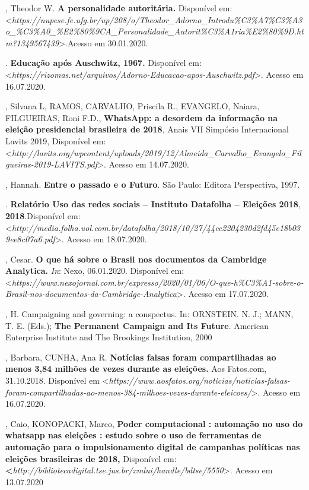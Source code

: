 \begin{bibliohedra}
, Theodor W. \textbf{A personalidade autoritária.} Disponível em:
\textless{}\emph{https://nupese.fe.ufg.br/up/208/o/Theodor\_Adorno\_Introdu\%C3\%A7\%C3\%A3o\_\%C3\%A0\_\%E2\%80\%9CA\_Personalidade\_Autorit\%C3\%A1ria\%E2\%80\%9D.htm?1349567439}\textgreater{}.Acesso
em 30.01.2020.

\titidem. \textbf{Educação após Auschwitz,
1967.} Disponível em:
\textless{}\emph{https://rizomas.net/arquivos/Adorno-Educacao-apos-Auschwitz.pdf}\textgreater{}.
Acesso em 16.07.2020.

, Silvana L, RAMOS, CARVALHO, Priscila R., EVANGELO, Naiara,
FILGUEIRAS, Roni F.D., \textbf{WhatsApp: a desordem da informação na
eleição presidencial brasileira de 2018}, Anais VII Simpósio
Internacional Lavits 2019, Disponível em:
\textless{}\emph{http://lavits.org/wpcontent/uploads/2019/12/Almeida\_Carvalho\_Evangelo\_Filgueiras-2019-LAVITS.pdf}\textgreater{}.
Acesso em 14.07.2020.

, Hannah. \textbf{Entre o passado e o Futuro}. São Paulo: Editora
Perspectiva, 1997.

. \textbf{Relatório Uso das redes sociais -- Instituto
Datafolha -- Eleições 2018}, \textbf{2018}.Disponível em:
\textless{}\emph{http://media.folha.uol.com.br/datafolha/2018/10/27/44cc2204230d2fd45e18b039ee8c07a6.pdf}\textgreater{}.
Acesso em 18.07.2020.

, Cesar. \textbf{O que há sobre o Brasil nos documentos da
Cambridge Analytica.} \emph{In}: Nexo, 06.01.2020. Disponível em:
\textless{}\emph{https://www.nexojornal.com.br/expresso/2020/01/06/O-que-h\%C3\%A1-sobre-o-Brasil-nos-documentos-da-Cambridge-Analytica}\textgreater{}.
Acesso em 17.07.2020.

, H. Campaigning and governing: a conspectus. In: ORNSTEIN. N. J.;
MANN, T. E. (Eds.); \textbf{The Permanent Campaign and Its Future}.
American Enterprise Institute and The Brookings Institution, 2000

, Barbara, CUNHA, Ana R. \textbf{Notícias falsas foram
compartilhadas ao menos 3,84 milhões de vezes durante as eleições.} Aos
Fatos.com, 31.10.2018. Disponível em
\textless{}\emph{https://www.aosfatos.org/noticias/noticias-falsas-foram-compartilhadas-ao-menos-384-milhoes-vezes-durante-eleicoes/}\textgreater{}.
Acesso em 16.07.2020.

, Caio, KONOPACKI, Marco, \textbf{Poder computacional : automação
no uso do whatsapp nas eleições : estudo sobre o uso de ferramentas de
automação para o impulsionamento digital de campanhas políticas nas
eleições brasileiras de 2018,} Disponível em:
\textbf{\textless{}}\emph{http://bibliotecadigital.tse.jus.br/xmlui/handle/bdtse/5550}\textgreater{}.
Acesso em 13.07.2020


\end{bibliohedra}
